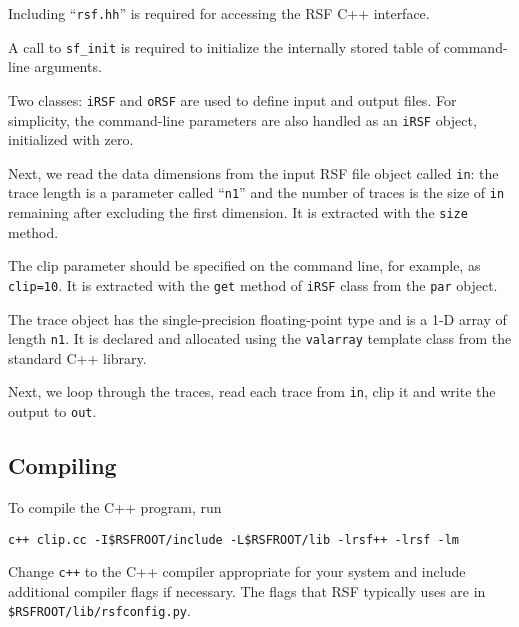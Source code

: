 
Including ``\texttt{rsf.hh}'' is required for accessing the RSF C++
interface.


A call to \texttt{sf\_init} is required to initialize the internally stored
table of command-line arguments.


Two classes: \texttt{iRSF} and \texttt{oRSF} are used to define input and
output files. For simplicity, the command-line parameters are also handled 
as an \texttt{iRSF} object, initialized with zero.


Next, we read the data dimensions from the input RSF file object called
\texttt{in}: the trace length is a parameter called ``\texttt{n1}'' and the
number of traces is the size of \texttt{in} remaining after excluding the
first dimension. It is extracted with the \texttt{size} method.

 
The clip parameter should be specified on the command line, for
example, as \texttt{clip=10}. It is extracted with the \texttt{get}
method of \texttt{iRSF} class from the \texttt{par} object.


The trace object has the single-precision floating-point type and is a
1-D array of length \texttt{n1}. It is declared and allocated using
the \texttt{valarray} template class from the standard C++ library.


Next, we loop through the traces, read each trace from \texttt{in}, clip it
and write the output to \texttt{out}.

\subsection{Compiling}

To compile the C++ program, run
\begin{verbatim}
c++ clip.cc -I$RSFROOT/include -L$RSFROOT/lib -lrsf++ -lrsf -lm
\end{verbatim}
Change \texttt{c++} to the C++ compiler appropriate for your system and
include additional compiler flags if necessary. The flags that RSF typically
uses are in \texttt{\$RSFROOT/lib/rsfconfig.py}.

